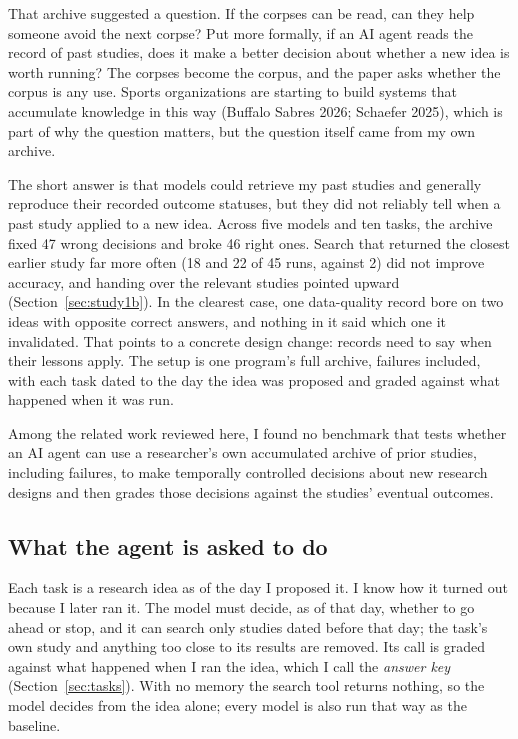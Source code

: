\documentclass[11pt]{article}
\begin{document}
That archive suggested a question. If the corpses can be read, can they help someone avoid the next corpse? Put more formally, if an AI agent reads the record of past studies, does it make a better decision about whether a new idea is worth running? The corpses become the corpus, and the paper asks whether the corpus is any use. Sports organizations are starting to build systems that accumulate knowledge in this way (Buffalo Sabres 2026; Schaefer 2025), which is part of why the question matters, but the question itself came from my own archive.

The short answer is that models could retrieve my past studies and generally reproduce their recorded outcome statuses, but they did not reliably tell when a past study applied to a new idea. Across five models and ten tasks, the archive fixed 47 wrong decisions and broke 46 right ones. Search that returned the closest earlier study far more often (18 and 22 of 45 runs, against 2) did not improve accuracy, and handing over the relevant studies pointed upward (Section~\ref{sec:study1b}). In the clearest case, one data-quality record bore on two ideas with opposite correct answers, and nothing in it said which one it invalidated. That points to a concrete design change: records need to say when their lessons apply. The setup is one program's full archive, failures included, with each task dated to the day the idea was proposed and graded against what happened when it was run.

Among the related work reviewed here, I found no benchmark that tests whether an AI agent can use a researcher's own accumulated archive of prior studies, including failures, to make temporally controlled decisions about new research designs and then grades those decisions against the studies' eventual outcomes.

\subsection*{What the agent is asked to do}

Each task is a research idea as of the day I proposed it. I know how it turned out because I later ran it. The model must decide, as of that day, whether to go ahead or stop, and it can search only studies dated before that day; the task's own study and anything too close to its results are removed. Its call is graded against what happened when I ran the idea, which I call the \emph{answer key} (Section~\ref{sec:tasks}). With no memory the search tool returns nothing, so the model decides from the idea alone; every model is also run that way as the baseline.
\end{document}
